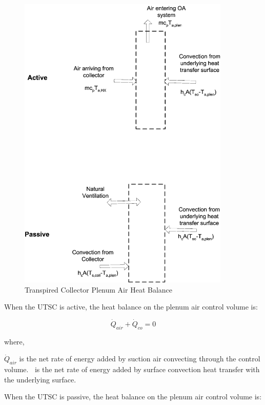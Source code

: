 \begin{figure}[hbtp] %
\centering
\includegraphics[width=0.9\textwidth, height=0.9\textheight, keepaspectratio=true]{media/image6664.png}
\caption{  Transpired Collector Plenum Air Heat Balance \protect \label{fig:transpired-collector-plenum-air-heat-balance}}
\end{figure}

When the UTSC is active, the heat balance on the plenum air control volume is:

\begin{equation}
  \dot{Q}_{air} + \dot{Q}_{co} = 0
\end{equation}

where,

\({\dot Q_{air}}\) is the net rate of energy added by suction air convecting through the control volume. \(_{ }\)~is the net rate of energy added by surface convection heat transfer with the underlying surface.

When the UTSC is passive, the heat balance on the plenum air control volume is:

